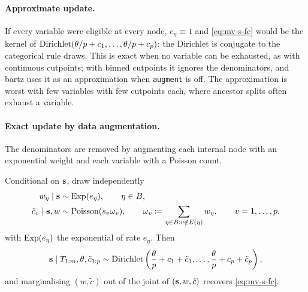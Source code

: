 \paragraph{Approximate update.}
If every variable were eligible at every node, $e_\eta \equiv 1$ and
\eqref{eq:mv-s-fc} would be the kernel of
$\mathrm{Dirichlet}(\theta/p + c_1, \dots, \theta/p + c_p)$: the Dirichlet is conjugate
to the categorical rule draws. This is exact
when no variable can be exhausted, as with continuous cutpoints; with binned
cutpoints it ignores the denominators, and bartz uses it as an approximation
when \texttt{augment} is off. The approximation is worst with few variables
with few cutpoints each, where ancestor splits often exhaust a variable.

\paragraph{Exact update by data augmentation.}
The denominators are removed by augmenting each internal node with an
exponential weight and each variable with a Poisson count.

\begin{prop}
	\label{prop:mv-s}
	Conditional on $\mathbf{s}$, draw independently
	\begin{align}
		\label{eq:mv-s-aug-w}
		w_\eta \mid \mathbf{s}
		 & \sim \mathrm{Exp}(e_\eta),
		\qquad \eta \in B,
		\\
		\label{eq:mv-s-aug}
		\tilde c_v \mid \mathbf{s}, w
		 & \sim \mathrm{Poisson}(s_v  \omega_v),
		\qquad
		\omega_v \coloneqq \sum_{\eta \in B :  v \notin E(\eta)} w_\eta,
		\qquad v = 1, \dots, p,
	\end{align}
	with $\mathrm{Exp}(e_\eta)$ the exponential of rate $e_\eta$. Then
	\begin{equation}
		\label{eq:mv-s-fc-aug}
		\mathbf{s} \mid T_{1:m}, \theta, \tilde c_{1:p} \sim
		\mathrm{Dirichlet}\left(\frac{\theta}{p} + c_1 + \tilde c_1, \dots,
		\frac{\theta}{p} + c_p + \tilde c_p\right),
	\end{equation}
	and marginalising $(w, \tilde c)$ out of the joint of
	$(\mathbf{s}, w, \tilde c)$ recovers \eqref{eq:mv-s-fc}.
\end{prop}

